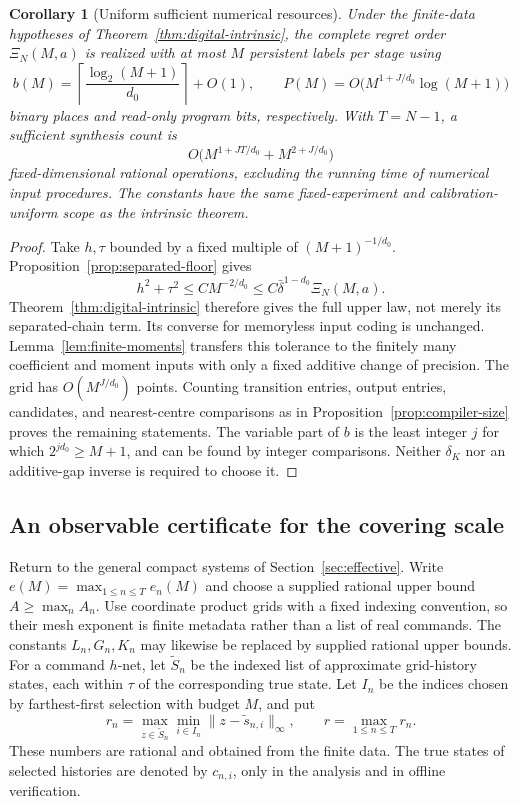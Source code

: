 \documentclass[11pt]{amsart}
\newtheorem{corollary}[theorem]{Corollary}
\theoremstyle{definition}\newtheorem{definition}[theorem]{Definition}
\theoremstyle{remark}\newtheorem{remark}[theorem]{Remark}
\begin{document}
\begin{corollary}[Uniform sufficient numerical resources]
\label{cor:uniform-resources}
Under the finite-data hypotheses of Theorem~\ref{thm:digital-intrinsic},
the complete regret order $\Xi_N(M,a)$ is realized with at most $M$
persistent labels per stage using
\begin{equation}\label{eq:uniform-resources}
 b(M)=\left\lceil\frac{\log_2(M+1)}{d_0}\right\rceil+O(1),
 \qquad
 P(M)=O\bigl(M^{1+J/d_0}\log(M+1)\bigr)
\end{equation}
binary places and read-only program bits, respectively. With $T=N-1$,
a sufficient synthesis count is
\[
 O\bigl(M^{1+JT/d_0}+M^{2+J/d_0}\bigr)
\]
fixed-dimensional rational operations, excluding the running time of
numerical input procedures. The constants have the same fixed-experiment
and calibration-uniform scope as the intrinsic theorem.
\end{corollary}
\begin{proof}
Take $h,\tau$ bounded by a fixed multiple of $(M+1)^{-1/d_0}$.
Proposition~\ref{prop:separated-floor} gives
\[
 h^2+\tau^2\le C M^{-2/d_0}
              \le C\bar\delta^{1-d_0}\Xi_N(M,a).
\]
Theorem~\ref{thm:digital-intrinsic} therefore gives the full upper
law, not merely its separated-chain term. Its converse for memoryless
input coding is unchanged. Lemma~\ref{lem:finite-moments} transfers
this tolerance to the finitely many coefficient and moment inputs with
only a fixed additive change of precision. The grid has
$O(M^{J/d_0})$ points. Counting transition entries, output entries,
candidates, and nearest-centre comparisons as in
Proposition~\ref{prop:compiler-size} proves the remaining statements.
The variable part of $b$ is the least integer $j$ for which
$2^{j d_0}\ge M+1$, and can be found by integer comparisons. Neither
$\delta_K$ nor an additive-gap inverse is required to choose it.
\end{proof}

\subsection{An observable certificate for the covering scale}
Return to the general compact systems of Section~\ref{sec:effective}.
Write $e(M)=\max_{1\le n\le T}e_n(M)$ and choose a supplied rational
upper bound $A\ge\max_n A_n$. Use coordinate product grids with a fixed indexing convention, so their
mesh exponent is finite metadata rather than a list of real commands.
The constants $L_n,G_n,K_n$ may likewise
be replaced by supplied rational upper bounds. For a command $h$-net,
let $\widetilde S_n$ be the indexed list of approximate grid-history
states, each within $\tau$ of the corresponding true state. Let $I_n$
be the indices chosen by farthest-first selection with budget $M$, and
put
\begin{equation}\label{eq:observable-radius}
 r_n=\max_{z\in\widetilde S_n}\min_{i\in I_n}
                   \|z-\widetilde s_{n,i}\|_\infty,
 \qquad r=\max_{1\le n\le T}r_n.
\end{equation}
These numbers are rational and obtained from the finite data. The true
states of selected histories are denoted by $c_{n,i}$, only in the
analysis and in offline verification.
\end{document}
